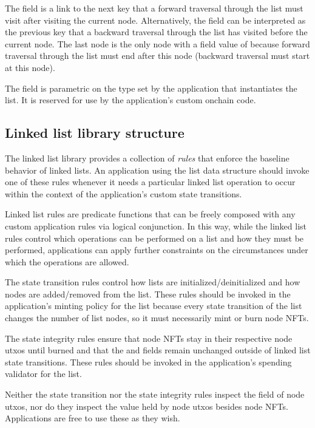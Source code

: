 \documentclass[../midgard.tex]{subfiles}
\begin{document}
The  field is a link to the next key that a forward traversal through the list must visit after visiting the current node. Alternatively, the  field can be interpreted as the previous key that a backward traversal through the list has visited before the current node. The last node is the only node with a  field value of  because forward traversal through the list must end after this node (backward traversal must start at this node).

The  field is parametric on the  type set by the application that instantiates the list. It is reserved for use by the application's custom onchain code.

\subsection{Linked list library structure}
\label{h:list-library-structure}

The linked list library provides a collection of \emph{rules} that enforce the baseline behavior of linked lists. An application using the list data structure should invoke one of these rules whenever it needs a particular linked list operation to occur within the context of the application's custom state transitions.

Linked list rules are predicate functions that can be freely composed with any custom application rules via logical conjunction. In this way, while the linked list rules control which operations can be performed on a list and how they must be performed, applications can apply further constraints on the circumstances under which the operations are allowed.

The state transition rules control how lists are initialized/deinitialized and how nodes are added/removed from the list. These rules should be invoked in the application's minting policy for the list because every state transition of the list changes the number of list nodes, so it must necessarily mint or burn node NFTs.

The state integrity rules ensure that node NFTs stay in their respective node utxos until burned and that the  and  fields remain unchanged outside of linked list state transitions. These rules should be invoked in the application's spending validator for the list.

Neither the state transition nor the state integrity rules inspect the  field of node utxos, nor do they inspect the value held by node utxos besides node NFTs. Applications are free to use these as they wish.
\end{document}
